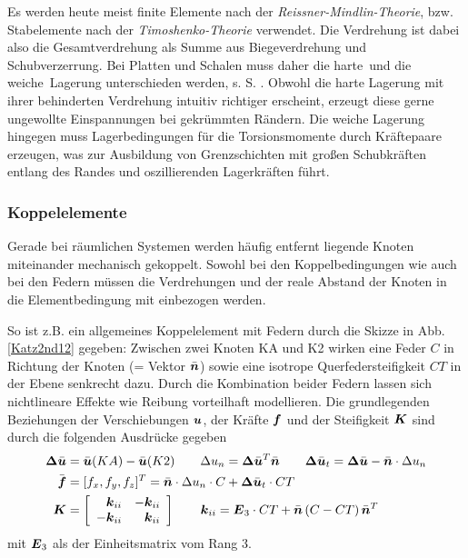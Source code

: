 Es werden heute meist finite Elemente nach der {\em Reissner-Mindlin-Theorie\/}, bzw. Stabelemente nach der {\em Timoshenko-Theorie\/} verwendet. Die Verdrehung ist dabei also die Gesamtverdrehung als Summe aus Biegeverdrehung und Schubverzerrung. Bei Platten und Schalen muss daher die \glq harte\grq\ und die \glq weiche\grq\ Lagerung unterschieden werden, s. S. \pageref{Lagerungsarten}. Obwohl die harte Lagerung mit ihrer behinderten Verdrehung intuitiv richtiger erscheint, erzeugt diese gerne ungewollte Einspannungen bei gekr\"{u}mmten R\"{a}ndern. Die weiche Lagerung hingegen muss Lagerbedingungen f\"{u}r die Torsionsmomente durch Kr\"{a}ftepaare erzeugen, was zur Ausbildung von Grenzschichten mit gro{\ss}en Schubkr\"{a}ften entlang des Randes und oszillierenden Lagerkr\"{a}ften f\"{u}hrt.

{\textcolor{sectionTitleBlue}{\subsubsection*{Koppelelemente}}}

Gerade bei r\"{a}umlichen Systemen werden h\"{a}ufig entfernt liegende Knoten miteinander mechanisch gekoppelt. Sowohl bei den Koppelbedingungen wie auch bei den Federn m\"{u}ssen die Verdrehungen und der reale Abstand der Knoten in die Elementbedingung mit einbezogen werden.

So ist z.B. ein allgemeines Koppelelement mit Federn durch die Skizze in Abb. \ref{Katz2nd12} gegeben: Zwischen zwei Knoten KA und K2 wirken eine Feder $C$ in Richtung der Knoten (= Vektor $\bar{\vek n}$)  sowie eine isotrope Querfedersteifigkeit $CT$ in der Ebene senkrecht dazu. Durch die Kombination beider Federn lassen sich nichtlineare Effekte wie Reibung vorteilhaft modellieren. Die grundlegenden Beziehungen der Verschiebungen $\vek u$, der Kr\"{a}fte $\vek f$ und der Steifigkeit $\vek K$ sind durch die folgenden Ausdr\"{u}cke gegeben
\begin{subequations}	
\begin{align}
\vek \Delta \bar{\vek u} &= \bar{\vek u}(KA) - \bar{\vek u}(K2) \qquad \Delta u_n = \vek \Delta \bar{\vek u}^T \bar{\vek n} \qquad \vek \Delta \bar{\vek u}_t = \vek \Delta \bar{\vek u} - \bar{\vek n} \cdot  \Delta u_n \\
\bar{\vek f} &= [f_x, f_y, f_z]^T = \bar{\vek n} \cdot \Delta u_n \cdot C + \vek \Delta \bar{\vek u}_t \cdot CT \\
\vek K &= \left[\barr{r r} \vek k_{ii} & - \vek k_{ii}\\  -\vek k_{ii} & \vek k_{ii} \earr\right] \qquad \vek k_{ii} = \vek E_3 \cdot CT + \bar{\vek n}\, (C - CT) \,\bar{\vek n}^T
\end{align}
\end{subequations}
mit $\vek E_3$ als der Einheitsmatrix vom Rang 3.

